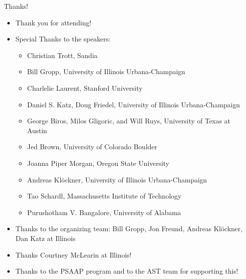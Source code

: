 \documentclass[aspectratio=169]{beamer}
\begin{document}
\begin{frame}{Thanks!}
  \begin{itemize}
    \item Thank you for attending!
    \item \alert{Special Thanks} to the speakers:
      \begin{itemize}
        \item Christian Trott, Sandia
        \item Bill Gropp, University of Illinois Urbana-Champaign
        \item Charlelie Laurent, Stanford University
        \item Daniel S. Katz, Doug Friedel, University of Illinois Urbana-Champaign
        \item George Biros,  Milos Gligoric, and Will Ruys, University of Texas at Austin
        \item Jed Brown, University of Colorado Boulder
        \item Joanna Piper Morgan, Oregon State University
        \item Andreas Kl\"ockner, University of Illinois Urbana-Champaign
        \item Tao Schardl, Massachusetts Institute of Technology
        \item Purushotham V. Bangalore, University of Alabama
      \end{itemize}
    \item Thanks to the organizing team: Bill Gropp, Jon Freund, Andreas Kl\"ockner, Dan Katz at Illinois
    \item Thanks Courtney McLearin at Illinois!
    \item Thanks to the PSAAP program and to the AST team for supporting this!
  \end{itemize}
\end{frame}
\end{document}
